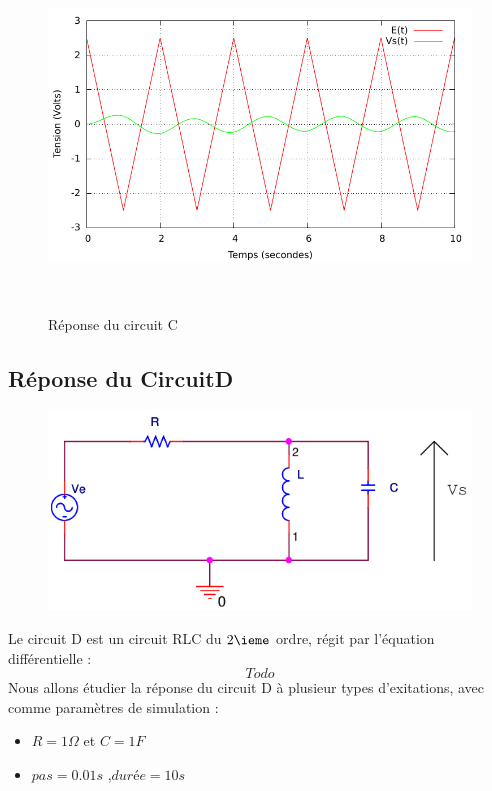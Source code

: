 \documentclass[a4paper,11pt]{article}
\begin{document}
\begin{figure}[h!]
\begin{minipage}[b]{0.5\linewidth}
   \end{minipage}
  \begin{minipage}[b]{0.5\linewidth}   
      \centering \includegraphics[scale=.68]{CCtriangle.pdf}
   \end{minipage}\\
 \caption{Réponse du circuit C}
\end{figure}

\newpage
  \subsection{Réponse du CircuitD}
  
\begin{figure}[H]
	 \begin{center}
	\includegraphics[scale=.5]{circuitD}
	\end{center}
      \end{figure}
   Le circuit D est un circuit RLC du $2\ieme$ ordre, régit par l'équation différentielle :
   \begin{equation*}
    Todo
   \end{equation*}
  Nous allons étudier la réponse du circuit D à plusieur types d'exitations, avec comme paramètres de simulation :  \\
  \begin{itemize}
   \item $R = 1 \Omega$ et $C = 1 F$
     \item $pas = 0.01 s$ ,$durée = 10s$ 
  \end{itemize}
\end{document}
